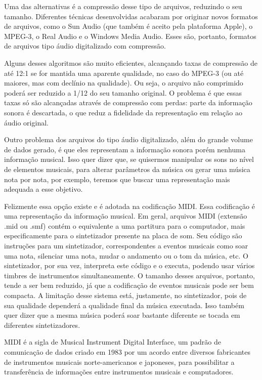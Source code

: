 Uma das alternativas é a compressão desse tipo de arquivos, reduzindo o seu tamanho. Diferentes técnicas desenvolvidas acabaram por originar novos formatos de arquivos, como o Sun Audio (que também é aceito pela plataforma Apple), o MPEG-3, o Real Audio e o Windows Media Audio. Esses são, portanto, formatos de arquivos tipo áudio digitalizado com compressão.

Alguns desses algoritmos são muito eficientes, alcançando taxas de compressão de até 12:1 se for mantida uma aparente qualidade, no caso do MPEG-3 (ou até maiores, mas com declínio na qualidade). Ou seja, o arquivo não comprimido poderá ser reduzido a 1/12 do seu tamanho original. O problema é que essas taxas só são alcançadas através de compressão com perdas: parte da informação sonora é descartada, o que reduz a fidelidade da representação em relação ao áudio original.

Outro problema dos arquivos do tipo áudio digitalizado, além do grande volume de dados gerado, é que eles representam a informação sonora porém nenhuma informação musical. Isso quer dizer que, se quisermos manipular os sons no nível de elementos musicais, para alterar parâmetros da música ou gerar uma música nota por nota, por exemplo, teremos que buscar uma representação mais adequada a esse objetivo.

Felizmente essa opção existe e é adotada na codificação MIDI. Essa codificação é uma representação da informação musical. Em geral, arquivos MIDI (extensão .mid ou .smf) contém o equivalente a uma partitura para o computador, mais especificamente para o sintetizador presente na placa de som. Seu código são instruções para um sintetizador, correspondentes a eventos musicais como soar uma nota, silenciar uma nota, mudar o andamento ou o tom da música, etc. O sintetizador, por sua vez, interpreta este código e o executa, podendo usar vários timbres de instrumentos simultaneamente. O tamanho desses arquivos, portanto, tende a ser bem reduzido, já que a codificação de
eventos musicais pode ser bem compacta. A limitação desse sistema está, justamente, no sintetizador, pois de sua qualidade dependerá a qualidade final da música executada. Isso também quer dizer que a mesma música poderá soar bastante diferente se tocada em diferentes sintetizadores.

MIDI é a sigla de Musical Instrument Digital Interface, um padrão de comunicação de dados criado em 1983 por um acordo entre diversos fabricantes de instrumentos musicais norte-americanos e japoneses, para possibilitar a transferência de informações entre instrumentos musicais e computadores.

